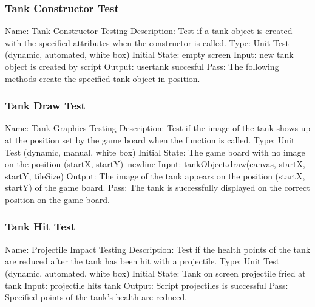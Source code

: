 \documentclass{article}
\begin{document}
\subsubsection{Tank Constructor Test}
Name: Tank Constructor Testing\newline
Description: Test if a tank object is created with the specified attributes 
when the constructor is called.\newline
Type: Unit Test (dynamic, automated, white box)\newline
Initial State: empty screen\newline
Input: new tank object is created by script\newline
Output: usertank succesful \newline
Pass: The following methods create the specified tank object in position.
\newline

\subsubsection{Tank Draw Test}
Name: Tank Graphics Testing\newline
Description: Test if the image of the tank shows up at the position set by the 
game board when the function is called.\newline
Type: Unit Test (dynamic, manual, white box)\newline
Initial State: The game board with no image on the position (startX, startY)
Input: tankObject.draw(canvas, startX, startY, tileSize)\newline
Output: The image of the tank appears on the position (startX, startY) of the 
game board.\newline
Pass: The tank is successfully displayed on the correct position on the game 
board.\newline

\subsubsection{Tank Hit Test}
Name: Projectile Impact Testing\newline
Description: Test if the health points of the tank are reduced after the tank 
has been hit with a projectile.\newline
Type: Unit Test (dynamic, automated, white box)\newline
Initial State: Tank on screen projectile fried at tank\newline
Input: projectile hits tank\newline
Output: Script projectiles is successful  \newline
Pass: Specified points of the tank’s health are reduced.\newline
\end{document}
